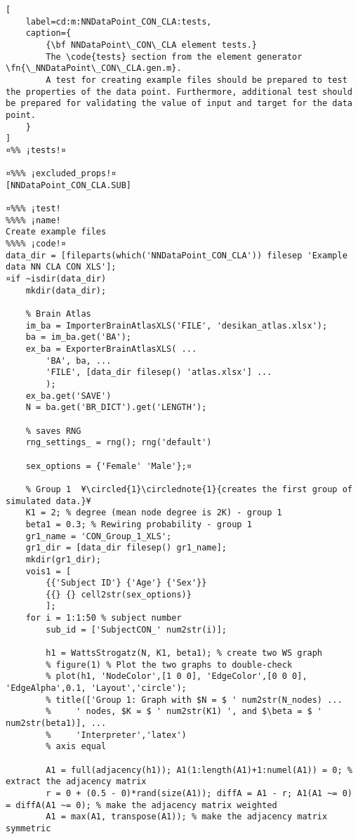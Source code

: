 \documentclass{tufte-handout}
\begin{document}
\clearpage

\begin{lstlisting}[
	label=cd:m:NNDataPoint_CON_CLA:tests,
	caption={
		{\bf NNDataPoint\_CON\_CLA element tests.}
		The \code{tests} section from the element generator \fn{\_NNDataPoint\_CON\_CLA.gen.m}.
		A test for creating example files should be prepared to test the properties of the data point. Furthermore, additional test should be prepared for validating the value of input and target for the data point.
	}
]			
¤%% ¡tests!¤

¤%%% ¡excluded_props!¤
[NNDataPoint_CON_CLA.SUB]

¤%%% ¡test!
%%%% ¡name!
Create example files
%%%% ¡code!¤
data_dir = [fileparts(which('NNDataPoint_CON_CLA')) filesep 'Example data NN CLA CON XLS'];
¤if ~isdir(data_dir)
    mkdir(data_dir);

    % Brain Atlas
    im_ba = ImporterBrainAtlasXLS('FILE', 'desikan_atlas.xlsx');
    ba = im_ba.get('BA');
    ex_ba = ExporterBrainAtlasXLS( ...
        'BA', ba, ...
        'FILE', [data_dir filesep() 'atlas.xlsx'] ...
        );
    ex_ba.get('SAVE')
    N = ba.get('BR_DICT').get('LENGTH');

    % saves RNG
    rng_settings_ = rng(); rng('default')

    sex_options = {'Female' 'Male'};¤

    % Group 1  ¥\circled{1}\circlednote{1}{creates the first group of simulated data.}¥
    K1 = 2; % degree (mean node degree is 2K) - group 1
    beta1 = 0.3; % Rewiring probability - group 1
    gr1_name = 'CON_Group_1_XLS';
    gr1_dir = [data_dir filesep() gr1_name];
    mkdir(gr1_dir);
    vois1 = [
        {{'Subject ID'} {'Age'} {'Sex'}}
        {{} {} cell2str(sex_options)}
        ];
    for i = 1:1:50 % subject number
        sub_id = ['SubjectCON_' num2str(i)];

        h1 = WattsStrogatz(N, K1, beta1); % create two WS graph
        % figure(1) % Plot the two graphs to double-check
        % plot(h1, 'NodeColor',[1 0 0], 'EdgeColor',[0 0 0], 'EdgeAlpha',0.1, 'Layout','circle');
        % title(['Group 1: Graph with $N = $ ' num2str(N_nodes) ...
        %     ' nodes, $K = $ ' num2str(K1) ', and $\beta = $ ' num2str(beta1)], ...
        %     'Interpreter','latex')
        % axis equal

        A1 = full(adjacency(h1)); A1(1:length(A1)+1:numel(A1)) = 0; % extract the adjacency matrix
        r = 0 + (0.5 - 0)*rand(size(A1)); diffA = A1 - r; A1(A1 ~= 0) = diffA(A1 ~= 0); % make the adjacency matrix weighted
        A1 = max(A1, transpose(A1)); % make the adjacency matrix symmetric


\end{lstlisting}
\end{document}
